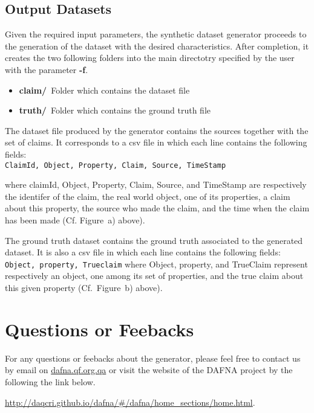 \documentclass[a4paper,10pt]{scrartcl}
\newcommand{\claim}[1]{\vspace*{0.5cm}\\\indent\indent\texttt{#1}\vspace*{0.5cm}}
\begin{document}
\subsection{Output Datasets}
Given the required input parameters, the synthetic dataset generator proceeds to the generation 
of the dataset with the desired characteristics. After completion, it creates the two following
folders into the main directotry specified by the user with the parameter \textbf{-f}.
\begin{itemize}
 \item \textbf{claim/}~Folder which contains the dataset file 
 \item \textbf{truth/}~Folder which contains the ground truth file
\end{itemize}

The dataset file produced by the generator contains the sources together with the set of claims.
It corresponds to a csv file in which each line	contains the following fields:
\claim{ClaimId, Object, Property, Claim, Source, TimeStamp}

\noindent where claimId, Object, Property, Claim, Source, and TimeStamp are respectively the identifer of the claim,
the real world object, one of its properties, a claim about this property, the source who made the claim, and
the time when the claim has been made (Cf. Figure~a) above).

The ground truth dataset contains the ground truth associated to the generated dataset. It is also a csv file in which each line
contains the following fields:
\claim{Object, property, Trueclaim}
where Object, property, and TrueClaim represent respectively an object, one among its set of properties, and the true claim about
this given property (Cf.\ Figure~b) above).

\section{Questions or Feebacks}
For any questions or feebacks about the generator, please feel free to contact us by email on \href{mailto:lberti@qf.org.qa}{dafna.qf.org.qa}
or visit the website of the DAFNA project by the following the link below.

\href{http://daqcri.github.io/dafna/\#/dafna/home\_sections/home.html}{http://daqcri.github.io/dafna/\#/dafna/home\_sections/home.html}.
\end{document}
